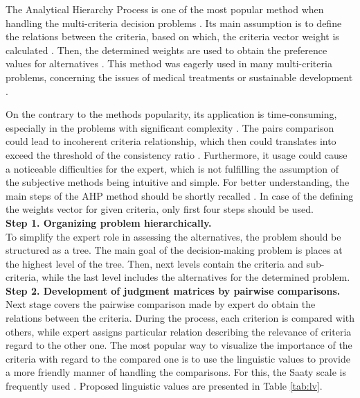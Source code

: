 The Analytical Hierarchy Process is one of the most popular method when handling the multi-criteria decision problems \cite{de2015criteria}. Its main assumption is to define the relations between the criteria, based on which, the criteria vector weight is calculated \cite{dewi2021decision}. Then, the determined weights are used to obtain the preference values for alternatives \cite{mathew2020novel}. This method was eagerly used in many multi-criteria problems, concerning the issues of medical treatments \cite{wang2020isa} or sustainable development \cite{suganthi2018multi}.

On the contrary to the methods popularity, its application is time-consuming, especially in the problems with significant complexity \cite{ccalik2019integrated}. The pairs comparison could lead to incoherent criteria relationship, which then could translates into exceed the threshold of the consistency ratio \cite{astanti2020raw}. Furthermore, it usage could cause a noticeable difficulties for the expert, which is not fulfilling the assumption of the subjective methods being intuitive and simple. For better understanding, the main steps of the AHP method should be shortly recalled \cite{goswami2020selecting}. In case of the defining the weights vector for given criteria, only first four steps should be used. \\

\noindent \textbf{Step 1. Organizing problem hierarchically.} \\

To simplify the expert role in assessing the alternatives, the problem should be structured as a tree. The main goal of the decision-making problem is places at the highest level of the tree. Then, next levels contain the criteria and sub-criteria, while the last level includes the alternatives for the determined problem. \\

\noindent\textbf{Step 2. Development of judgment matrices by pairwise comparisons.} \\

Next stage covers the pairwise comparison made by expert do obtain the relations between the criteria. During the process, each criterion is compared with others, while expert assigns particular relation describing the relevance of criteria regard to the other one. The most popular way to visualize the importance of the criteria with regard to the compared one is to use the linguistic values to provide a more friendly manner of handling the comparisons. For this, the Saaty scale is frequently used \cite{zhou2019attracts}. Proposed linguistic values are presented in Table \ref{tab:lv}.

